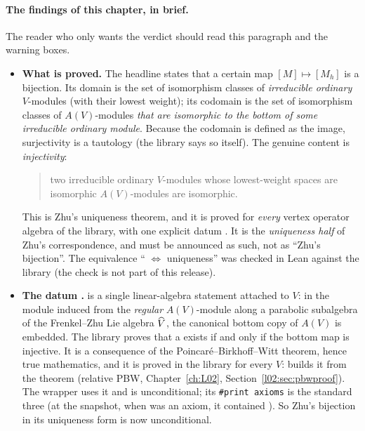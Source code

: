 \paragraph{The findings of this chapter, in brief.} The reader who only wants the verdict should read this paragraph
and the warning boxes.
\begin{itemize}
\item \textbf{What is proved.} The headline  states that a certain map
  $[M]\mapsto[M_h]$ is a bijection. Its domain is the set of isomorphism classes of \emph{irreducible ordinary}
  $V$-modules (with their lowest weight); its codomain is the set of isomorphism classes of $A(V)$-modules
  \emph{that are isomorphic to the bottom of some irreducible ordinary module}. Because the codomain is defined as the
  image, surjectivity is a tautology (the library says so itself). The genuine content is \emph{injectivity}:
  \begin{quote}
  two irreducible ordinary $V$-modules whose lowest-weight spaces are isomorphic $A(V)$-modules are isomorphic.
  \end{quote}
  This is Zhu's uniqueness theorem, and it is proved for \emph{every} vertex operator algebra of the library, with one
  explicit datum . It is the \emph{uniqueness half} of Zhu's correspondence, and must be announced as such, not
  as ``Zhu's bijection''. The equivalence `` $\iff$ uniqueness'' was checked in Lean against the
  library (the check is not part of this release).
\item \textbf{The datum .}  is a single
  linear-algebra statement attached to $V$: in the module induced from the \emph{regular} $A(V)$-module along a
  parabolic subalgebra of the Frenkel--Zhu Lie algebra $\widehat{V}$, the canonical bottom copy of $A(V)$ is
  embedded. The library proves that a  exists if and only if the bottom map is injective. It is a
  consequence of the Poincar\'e--Birkhoff--Witt theorem, hence true mathematics, and it is proved in the library
  for every $V$:  builds it from the theorem  (relative PBW,
  Chapter~\ref{ch:L02}, Section~\ref{l02:sec:pbwproof}). The wrapper  uses it and is
  unconditional; its \texttt{\#print axioms} is the standard three (at the snapshot, when
   was an axiom, it contained ). So Zhu's bijection in its uniqueness form is now
  unconditional.

\end{itemize}
